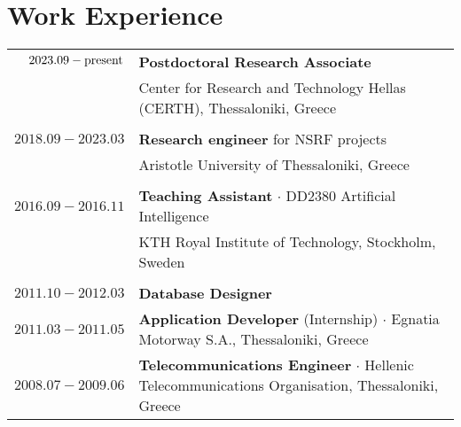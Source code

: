 \documentclass[a4paper,10pt,twoside]{article}
\begin{document}


\par{\bigskip\par}



\section{Work Experience}

\begin{tabular}{rp{12cm}}
$2023.09 - \hfill \textnormal{present} \hfill$ & \textbf{Postdoctoral Research Associate} \\
                    & Center for Research and Technology Hellas (CERTH), Thessaloniki, Greece\\
&\\
$2018.09 - 2023.03$ & \textbf{Research engineer} for NSRF projects\\
                    & Aristotle University of Thessaloniki, Greece\\
&\\
$2016.09 - 2016.11$ & \textbf{Teaching Assistant} $\cdot$ DD2380 Artificial Intelligence\\
                    & KTH Royal Institute of Technology, Stockholm, Sweden\\
&\\
$2011.10 - 2012.03$ & \textbf{Database Designer}\\
$2011.03 - 2011.05$ & \textbf{Application Developer} (Internship) $\cdot$ Egnatia Motorway S.A., Thessaloniki, Greece\\
$2008.07 - 2009.06$ & \textbf{Telecommunications Engineer} $\cdot$ Hellenic Telecommunications Organisation, Thessaloniki, Greece\\
\end{tabular} \\
\end{document}
